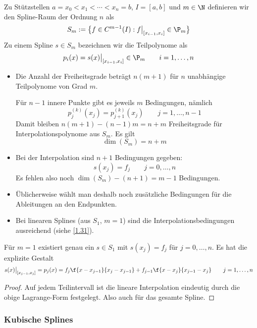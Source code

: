 \documentclass[11pt]{scrartcl}
\begin{document}
\begin{df}
	\label{1.30}
	Zu Stützstellen $a=x_0 < x_1 < \dotsb < x_n = b$, $I=[a,b]$ und $m\in \N$ definieren wir den Spline-Raum der Ordnung $n$ als
	\[
		S_m := \big\{ f\in C^{m-1}(I) : f\big|_{[x_{i-1},x_i]}\in \P_m\big\}
	\]
	Zu einem Spline $s\in S_m$ bezeichnen wir die Teilpolynome als
	\[
		p_i(x) = s(x)\big|_{[x_{i-1},x_i]} \in \P_m \qquad i=1,\dotsc,n
	\]
\end{df}

\begin{nt*}
	\begin{itemize}
		\item
			Die Anzahl der Freiheitsgrade beträgt $n(m+1)$ für $n$ unabhängige Teilpolynome von Grad $m$.

			Für $n-1$ innere Punkte gibt es jeweils $m$ Bedingungen, nämlich
			\[
				p_j^{(k)}(x_j) = p_{j+1}^{(k)}(x_j) \qquad j=1,\dotsc,n-1
			\]
			Damit bleiben $n(m+1)-(n-1)m = n+m$ Freiheitsgrade für Interpolationspolynome aus $S_m$.
			Es gilt
			\[
				\dim (S_m) = n+m
			\]
		\item
			Bei der Interpolation sind $n+1$ Bedingungen gegeben:
			\[
				s(x_j) = f_j \qquad j=0,\dotsc,n
			\]
			Es fehlen also noch $\dim (S_m) - (n+1) = m-1$ Bedingungen.
		\item
			Üblicherweise wählt man deshalb noch zusätzliche Bedingungen für die Ableitungen an den Endpunkten.
		\item
			Bei linearen Splines (aus $S_1$, $m=1$) sind die Interpolationsbedingungen ausreichend (siehe \ref{1.31}).
	\end{itemize}
\end{nt*}

\begin{st}
	\label{1.31}
	Für $m=1$ existiert genau ein $s\in S_1$ mit $s(x_j) = f_j$ für $j=0,\dotsc,n$.
	Es hat die explizite Gestalt
	\[
		s(x) \big|_{[x_{j-1},x_j]} = p_j(x) = f_j \f {x-x_{j-1}}{x_j - x_{j-1}} + f_{j-1}\f {x-x_j}{x_{j-1}-x_j}
		\qquad j=1,\dotsc,n
	\]
	\begin{proof}
		Auf jedem Teilintervall ist die lineare Interpolation eindeutig durch die obige Lagrange-Form festgelegt.
		Also auch für das gesamte Spline.
	\end{proof}
\end{st}

\subsubsection{Kubische Splines}
\end{document}
